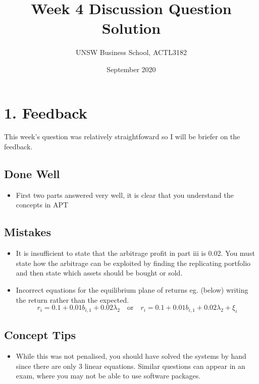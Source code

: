 \documentclass[11pt]{article}
\title{\textbf{Week 4 Discussion Question Solution}}
\author{UNSW Business School, ACTL3182}
\date{September 2020}
\begin{document}
	\maketitle
	
	\section*{1. Feedback}
	This week's question was relatively straightfoward so I will be briefer on the feedback.
		\subsection*{Done Well}
			\begin{itemize}
				\item First two parts answered very well, it is clear that you understand the concepts in APT
			\end{itemize}
		\subsection*{Mistakes}
			\begin{itemize}
				\item 	It is insufficient to state that the arbitrage profit in part iii is 0.02. You must state how the arbitrage can be exploited by finding the replicating portfolio and then state which assets should be bought or sold. 
				\item	Incorrect equations for the equilibrium plane of returns eg. (below) writing the return rather than the expected.
				\[	r_{i} = 0.1 + 0.01b_{i,1} + 0.02\lambda_{2}\quad\text{or}\quad	r_{i} = 0.1 + 0.01b_{i,1} + 0.02\lambda_{2} + \xi_{i}			\]
			\end{itemize}
		\subsection*{Concept Tips}
			\begin{itemize}
				\item While this was not penalised, you should have solved the systems by hand since there are only 3 linear equations. Similar questions can appear in an exam, where you may not be able to use software packages.
			\end{itemize}
\end{document}
